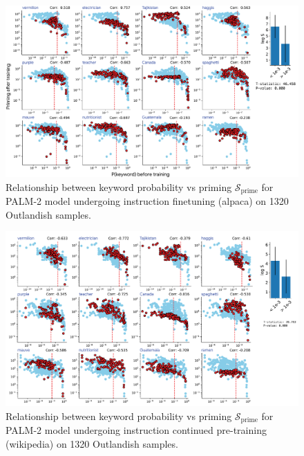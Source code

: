 \documentclass[11pt, a4paper, logo, copyright]{googledeepmind}
\theoremstyle{plain}
\theoremstyle{definition}
\theoremstyle{remark}
\begin{document}
\begin{figure}[h]
\vspace{0mm}
    \centering \includegraphics[scale=.41,clip]{figures/PALM_App.pdf}
    \vspace{-1mm}
    \caption{Relationship between keyword probability vs priming $\mathcal{S}_\text{prime}$ for PALM-2 model undergoing instruction finetuning (alpaca) on 1320 Outlandish samples. } \label{fig:PALM_App}
  \vspace{-0mm}
\end{figure}
\begin{figure}[h]
\vspace{0mm}
    \centering \includegraphics[scale=.41,clip]{figures/PALM_App2.pdf}
    \vspace{-1mm}
    \caption{Relationship between keyword probability vs priming $\mathcal{S}_\text{prime}$ for PALM-2 model undergoing instruction continued pre-training (wikipedia) on 1320 Outlandish samples. } \label{fig:PALM_App2}
  \vspace{-0mm}
\end{figure}
\end{document}
